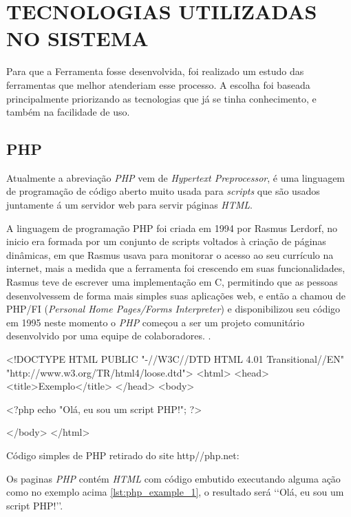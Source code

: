 \chapter{TECNOLOGIAS UTILIZADAS NO SISTEMA}

Para que a Ferramenta fosse desenvolvida, foi realizado um estudo das ferramentas que melhor atenderiam esse processo. A escolha foi baseada principalmente priorizando as tecnologias que já se tinha conhecimento, e também na facilidade de uso.

\section{PHP}

Atualmente a abreviação \textit{PHP} vem de \textit{Hypertext Preprocessor}, é uma linguagem de programação de código aberto muito usada para \textit{scripts} que são usados juntamente á um servidor web para servir páginas \textit{HTML}.

A linguagem de programação PHP foi criada em 1994 por Rasmus Lerdorf, no inicio era formada por um conjunto de scripts voltados à criação de páginas dinâmicas, em que Rasmus usava para monitorar o acesso ao seu currículo na internet, mais a medida que a ferramenta foi crescendo em suas funcionalidades, Rasmus teve de escrever uma implementação em C, permitindo que as pessoas desenvolvessem de forma mais simples suas aplicações web, e então a chamou de PHP/FI (\textit{Personal Home Pages/Forms Interpreter}) e disponibilizou seu código em 1995 neste momento o \textit{PHP} começou a ser um projeto comunitário desenvolvido por uma equipe de colaboradores. \cite[p.~20]{pablo-php}.

\begin{listing}
    \begin{phpcode}
    <!DOCTYPE HTML PUBLIC "-//W3C//DTD HTML 4.01 Transitional//EN"
    "http://www.w3.org/TR/html4/loose.dtd">
    <html>
        <head>
            <title>Exemplo</title>
        </head>
        <body>

        <?php
            echo "Olá, eu sou um script PHP!";
        ?>

        </body>
    </html>
    \end{phpcode}
    \caption{Código simples de PHP retirado do site http//php.net:}
    \label{lst:php_example_1}
\end{listing}

Os paginas \textit{PHP} contém \textit{HTML} com código embutido executando alguma ação como no exemplo acima \ref{lst:php_example_1}, o resultado será \lq\lq Olá, eu sou um script PHP!\rq\rq.

